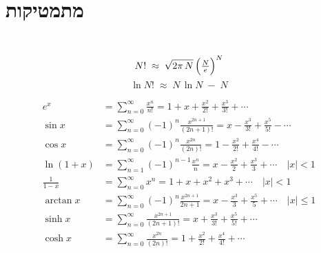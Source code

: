 \section{מתמטיקות}
\begin{cheatformula}\\
    $$N! \;\approx\; \sqrt{2\pi\,N}\,\Bigl(\tfrac{N}{e}\Bigr)^{N}$$
    $$\ln N! \;\approx\; N\,\ln N \;-\; N$$
\end{cheatformula}



\begin{cheatformula}
\begin{align*}
e^x &= \sum_{n=0}^{\infty} \frac{x^n}{n!} = 1 + x + \frac{x^2}{2!} + \frac{x^3}{3!} + \cdots \\[6pt]
\sin x &= \sum_{n=0}^{\infty} (-1)^n \frac{x^{2n+1}}{(2n+1)!} = x - \frac{x^3}{3!} + \frac{x^5}{5!} - \cdots \\[6pt]
\cos x &= \sum_{n=0}^{\infty} (-1)^n \frac{x^{2n}}{(2n)!} = 1 - \frac{x^2}{2!} + \frac{x^4}{4!} - \cdots \\[6pt]
\ln(1 + x) &= \sum_{n=1}^{\infty} (-1)^{n-1} \frac{x^n}{n}
= x - \frac{x^2}{2} + \frac{x^3}{3} + \cdots
\quad  |x| < 1 \\[6pt]
\frac{1}{1 - x} &= \sum_{n=0}^{\infty} x^n 
= 1 + x + x^2 + x^3 + \cdots
\quad |x| < 1 \\[6pt]
\arctan x &= \sum_{n=0}^{\infty} (-1)^n \frac{x^{2n+1}}{2n+1}
= x - \frac{x^3}{3} + \frac{x^5}{5} + \cdots
\quad |x| \le 1 \\[6pt]
\sinh x &= \sum_{n=0}^{\infty} \frac{x^{2n+1}}{(2n+1)!}
= x + \frac{x^3}{3!} + \frac{x^5}{5!} + \cdots \\[6pt]
\cosh x &= \sum_{n=0}^{\infty} \frac{x^{2n}}{(2n)!}
= 1 + \frac{x^2}{2!} + \frac{x^4}{4!} + \cdots
\end{align*}

\end{cheatformula}

